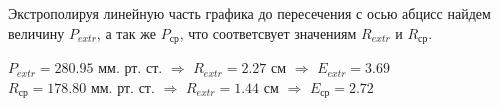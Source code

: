     Экстрополируя линейную часть графика до пересечения с осью абцисс найдем величину $P_{extr}$, а так же
    $P_{\text{ср}}$, что соответсвует значениям $R_{extr}$ и $R_{\text{ср}}$.

    \begin{center}
        $P_{extr} = 280.95$ мм. рт. ст. $\Rightarrow$ $R_{extr} = 2.27$ см $\Rightarrow$ $E_{extr} = 3.69$\\
        $R_{\text{ср}} = 178.80$ мм. рт. ст. $\Rightarrow$ $R_{extr} = 1.44$ см $\Rightarrow$ $E_{\text{ср}}  = 2.72$
    \end{center}
